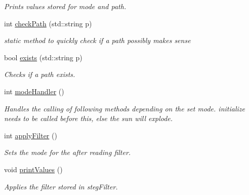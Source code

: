 \begin{DoxyCompactItemize}
\begin{DoxyCompactList}\small\item\em Prints values stored for mode and path. \end{DoxyCompactList}\item 
int \mbox{\hyperlink{classSteganoMessage_a9d87adef1584cc184ccd4b5d86fba744}{check\+Path}} (std\+::string p)
\begin{DoxyCompactList}\small\item\em static method to quickly check if a path possibly makes sense \end{DoxyCompactList}\item 
bool \mbox{\hyperlink{classSteganoMessage_acc5a49a35b46d8bf4c40cca8b8c5a52b}{exists}} (std\+::string p)
\begin{DoxyCompactList}\small\item\em Checks if a path exists. \end{DoxyCompactList}\item 
int \mbox{\hyperlink{classSteganoMessage_a2649e515941e730520b759282d00dcd6}{mode\+Handler}} ()
\begin{DoxyCompactList}\small\item\em Handles the calling of following methods depending on the set mode. initialize needs to be called before this, else the sun will explode. \end{DoxyCompactList}\item 
int \mbox{\hyperlink{classSteganoMessage_aec575d6949cf2eb49adefe2f1299d075}{apply\+Filter}} ()
\begin{DoxyCompactList}\small\item\em Sets the mode for the after reading filter. \end{DoxyCompactList}\item 
void \mbox{\hyperlink{classSteganoMessage_a3ea3f5ff720bf56d33f168d47e2897b0}{print\+Values}} ()
\begin{DoxyCompactList}\small\item\em Applies the filter stored in steg\+Filter. \end{DoxyCompactList}\end{DoxyCompactItemize}
